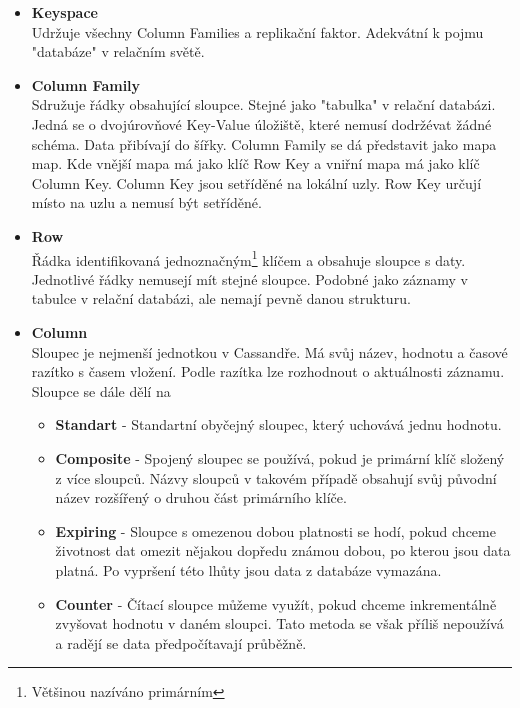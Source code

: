 \documentclass{article}
\begin{document}
\begin{itemize}
\item \textbf{Keyspace} \hfill \\
Udržuje všechny Column Families a replikační faktor. Adekvátní k pojmu "databáze" v relačním světě.

\item \textbf{Column Family} \hfill \\
Sdružuje řádky obsahující sloupce. Stejné jako "tabulka" v relační databázi. Jedná se o dvojúrovňové Key-Value úložiště, které nemusí dodržévat žádné schéma. Data přibívají do šířky. Column Family se dá představit jako mapa map. Kde vnější mapa má jako klíč Row Key a vniřní mapa má jako klíč Column Key. Column Key jsou setříděné na lokální uzly. Row Key určují místo na uzlu a nemusí být setříděné.

\item \textbf{Row}\hfill \\
Řádka identifikovaná jednoznačným\footnote{Většinou nazíváno primárním} klíčem a obsahuje sloupce s daty. Jednotlivé řádky nemusejí mít stejné sloupce. Podobné jako záznamy v tabulce v relační databázi, ale nemají pevně danou strukturu.

\item \textbf{Column}\hfill \\
Sloupec je nejmenší jednotkou v Cassandře. Má svůj název, hodnotu a časové razítko s časem vložení. Podle razítka lze rozhodnout o aktuálnosti záznamu. Sloupce se dále dělí na
\begin{itemize}
\item \textbf{Standart} - Standartní obyčejný sloupec, který uchovává jednu hodnotu.

\item \textbf{Composite} - Spojený sloupec se používá, pokud je primární klíč složený z více sloupců. Názvy sloupců v takovém případě obsahují svůj původní název rozšířený o druhou část primárního klíče.

\item \textbf{Expiring} - Sloupce s omezenou dobou platnosti se hodí, pokud chceme životnost dat omezit nějakou dopředu známou dobou, po kterou jsou data platná. Po vypršení této lhůty jsou data z databáze vymazána.

\item \textbf{Counter} - Čítací sloupce můžeme využít, pokud chceme inkrementálně zvyšovat hodnotu v daném sloupci. Tato metoda se však příliš nepoužívá a radějí se data předpočítavají průběžně.
\end{itemize}
\end{itemize}
\end{document}
